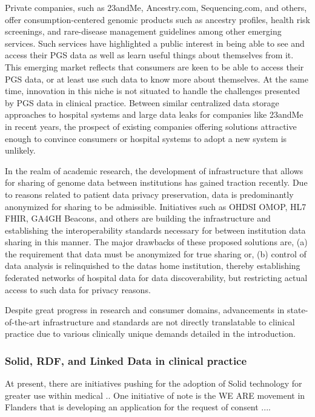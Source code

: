 \documentclass[runningheads]{llncs}
\begin{document}
Private companies, such as 23andMe, Ancestry.com, Sequencing.com, and others, offer consumption-centered genomic products such as ancestry profiles, health risk screenings, and rare-disease management guidelines among other emerging services. 
Such services have highlighted a public interest in being able to see and access their PGS data as well as learn useful things about themselves from it.
This emerging market reflects that consumers are keen to be able to access their PGS data, or at least use such data to know more about themselves. 
At the same time, innovation in this niche is not situated to handle the challenges presented by PGS data in clinical practice. 
Between similar centralized data storage approaches to hospital systems and large data leaks for companies like 23andMe in recent years, the prospect of existing companies offering solutions attractive enough to convince consumers or hospital systems to adopt a new system is unlikely. 

In the realm of academic research, the development of infrastructure that allows for sharing of genome data between institutions has gained traction recently. 
Due to reasons related to patient data privacy preservation, data is predominantly anonymized for sharing to be admissible. 
Initiatives such as OHDSI OMOP, HL7 FHIR, GA4GH Beacons, and others are building the infrastructure and establishing the interoperability standards necessary for between institution data sharing in this manner. 
The major drawbacks of these proposed solutions are, (a) the requirement that data must be anonymized for true sharing or, (b) control of data analysis is relinquished to the data\textquotesingle s home institution, thereby establishing federated networks of hospital data for data discoverability, but restricting actual access to such data for privacy reasons.

Despite great progress in research and consumer domains, advancements in state-of-the-art infrastructure and standards are not directly translatable to clinical practice due to various clinically unique demands detailed in the introduction. 

\subsubsection{Solid, RDF, and Linked Data in clinical practice}
At present, there are initiatives pushing for the adoption of Solid technology for greater use within medical ..
One initiative of note is the WE ARE movement in Flanders that is developing an application for the request of consent ....
\end{document}
